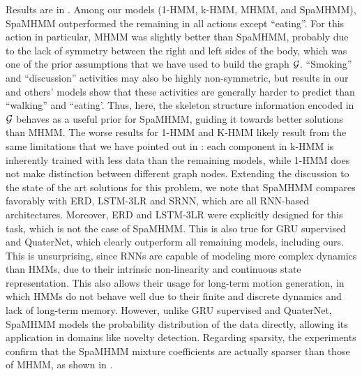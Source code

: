 Results are in . Among our models (1-HMM, k-HMM, MHMM, and Spa\allowbreak MHMM), SpaMHMM outperformed the remaining in all actions except ``eating''. For this action in particular, MHMM was slightly better than SpaMHMM, probably due to the lack of symmetry between the right and left sides of the body, which was one of the prior assumptions that we have used to build the graph ${\mathcal{G}}$. ``Smoking'' and ``discussion'' activities may also be highly non-symmetric, but results in our and others' models show that these activities are generally harder to predict than ``walking'' and ``eating'. Thus, here, the skeleton structure information encoded in ${\mathcal{G}}$ behaves as a useful prior for SpaMHMM, guiding it towards better solutions than MHMM. The worse results for 1-HMM and K-HMM likely result from the same limitations that we have pointed out in : each component in k-HMM is inherently trained with less data than the remaining models, while 1-HMM does not make distinction between different graph nodes. Extending the discussion to the state of the art solutions for this problem, we note that SpaMHMM compares favorably with ERD, LSTM-3LR and SRNN, which are all RNN-based architectures. Moreover, ERD and LSTM-3LR were explicitly designed for this task, which is not the case of SpaMHMM. This is also true for GRU supervised and QuaterNet, which clearly outperform all remaining models, including ours. This is unsurprising, since RNNs are capable of modeling more complex dynamics than HMMs, due to their intrinsic non-linearity and continuous state representation. This also allows their usage for long-term motion generation, in which HMMs do not behave well due to their finite and discrete dynamics and lack of long-term memory. However, unlike GRU supervised and QuaterNet, SpaMHMM  models the probability distribution of the data directly, allowing its application in domains like novelty detection. Regarding sparsity, the experiments confirm that the SpaMHMM mixture coefficients are actually sparser than those of MHMM, as shown in .

